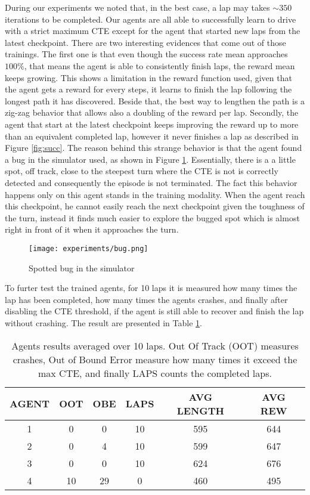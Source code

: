 During our experiments we noted that, in the best case, a lap may takes $\sim 350$ iterations to be completed. Our agents are all able to successfully learn to drive with a strict maximum CTE except for the agent that started new laps from the latest checkpoint. There are two interesting evidences that come out of those trainings. The first one is that even though the success rate mean approaches $100\%$, that means the agent is able to consistently finish laps, the reward mean keeps growing. This shows a limitation in the reward function used, given that the agent gets a reward for every steps, it learns to finish the lap following the longest path it has discovered. Beside that, the best way to lengthen the path is a zig-zag behavior that allows also a doubling of the reward per lap. Secondly, the agent that start at the latest checkpoint keeps improving the reward up to more than an equivalent completed lap, however it never finishes a lap as described in Figure \ref{fig:succ}. The reason behind this strange behavior is that the agent found a bug in the simulator used, as shown in Figure \ref{fig:bug}. Essentially, there is a a little spot, off track, close to the steepest turn where the CTE is not is correctly detected and consequently the episode is not terminated. The fact this behavior happens only on this agent stands in the training modality. When the agent reach this checkpoint, he cannot easily reach the next checkpoint given the toughness of the turn, instead it finds much easier to explore the bugged spot which is almost right in front of it when it approaches the turn.

\begin{figure}[h]
  \begin{center}
    \texttt{[image: experiments/bug.png]}
  \end{center}
  \caption{Spotted bug in the simulator}
  \label{fig:bug}
\end{figure}

To furter test the trained agents, for 10 laps it is measured how many times the lap has been completed, how many times the agents crashes, and finally after disabling the CTE threshold, if the agent is still able to recover and finish the lap without crashing. The result are presented in Table \ref{tab:simagent}.

\begin{table}
  \centering
  \begin{tabular}{|c|c|c|c|c|c|}
  \hline
  AGENT & OOT & OBE & LAPS & AVG LENGTH & AVG REW \\ \hline
  1 & 0 & 0 & 10 & 595 & 644 \\
  2 & 0 & 4 & 10 & 599 & 647  \\ \hline
  3 & 0 & 0 & 10 & 624 & 676 \\
  4 & 10 & 29 & 0 & 460 & 495  \\ \hline
  \end{tabular}
  \caption{Agents results averaged over 10 laps. Out Of Track (OOT) measures crashes, Out of Bound Error measure how many times it exceed the max CTE, and finally LAPS counts the completed laps.}
  \label{tab:simagent}
\end{table}

